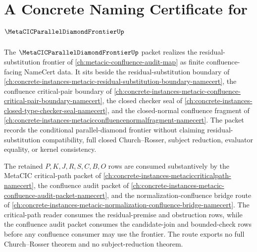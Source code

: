 \chapter{A Concrete Naming Certificate for $\MetaCICParallelDiamondFrontierUp$}
\label{ch:concrete-instances-metacic-parallel-diamond-frontier-namecert}

The $\MetaCICParallelDiamondFrontierUp$ packet realizes the residual-substitution frontier of \autoref{ch:metacic-confluence-audit-map} as finite confluence-facing NameCert data. It sits beside the residual-substitution boundary of \autoref{ch:concrete-instances-metacic-residual-substitution-boundary-namecert}, the confluence critical-pair boundary of \autoref{ch:concrete-instances-metacic-confluence-critical-pair-boundary-namecert}, the closed checker seal of \autoref{ch:concrete-instances-closed-type-checker-seal-namecert}, and the closed-normal confluence fragment of \autoref{ch:concrete-instances-metacicconfluencenormalfragment-namecert}. The packet records the conditional parallel-diamond frontier without claiming residual-substitution compatibility, full closed Church--Rosser, subject reduction, evaluator equality, or kernel consistency.

The retained $P,K,J,R,S,C,B,O$ rows are consumed substantively by the MetaCIC critical-path packet of \autoref{ch:concrete-instances-metaciccriticalpath-namecert}, the confluence audit packet of \autoref{ch:concrete-instances-metacic-confluence-audit-packet-namecert}, and the normalization-confluence bridge route of \autoref{ch:concrete-instances-metacic-normalization-confluence-bridge-namecert}. The critical-path reader consumes the residual-premise and obstruction rows, while the confluence audit packet consumes the candidate-join and bounded-check rows before any confluence consumer may use the frontier. The route exports no full Church--Rosser theorem and no subject-reduction theorem.



